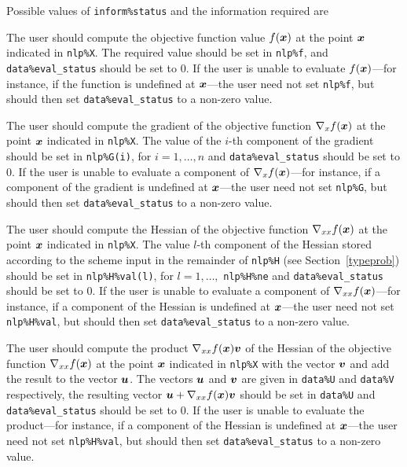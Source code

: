 \documentclass{galahad}
\begin{document}
Possible values of {\tt inform\%status} and the information required are
\begin{description}
 The user should compute the objective function
     value $f({\bm{x}})$ at the point ${\bm{x}}$ indicated in {\tt nlp\%X}.
     The required value should be set in {\tt nlp\%f}, and
     {\tt data\%eval\_status} should be set to 0. If the user is
     unable to evaluate $f({\bm{x}})$---for instance, if the function is
     undefined at ${\bm{x}}$---the user need not set {\tt nlp\%f}, but
     should then set {\tt data\%eval\_status} to a non-zero value.

 The user should compute the gradient
     of the objective function $\nabla_x f({\bm{x}})$ at the point ${\bm{x}}$
     indicated in {\tt nlp\%X}.
     The value of the $i$-th component of the gradient should be set
     in {\tt nlp\%G(i)},      for $i = 1, \ldots, n$ and
     {\tt data\%eval\_status} should be set to 0. If the user is
     unable to evaluate a component of $\nabla_x f({\bm{x}})$---for instance,
     if a component of the gradient is
     undefined at ${\bm{x}}$---the user need not set {\tt nlp\%G}, but
     should then set {\tt data\%eval\_status} to a non-zero value.

 The user should compute the Hessian
     of the objective function $\nabla_{xx} f({\bm{x}})$ at the point ${\bm{x}}$
     indicated in {\tt nlp\%X}.
     The value $l$-th component of the Hessian stored according to the
     scheme input in the remainder of {\tt nlp\%H} (see Section~\ref{typeprob})
     should be set in {\tt nlp\%H\%val(l)},
     for $l = 1, \ldots,$ {\tt  nlp\%H\%ne} and
     {\tt data\%eval\_status} should be set to 0. If the user is
     unable to evaluate a component of $\nabla_{xx} f({\bm{x}})$---for instance,
     if a component of the Hessian is
     undefined at ${\bm{x}}$---the user need not set {\tt nlp\%H\%val}, but
     should then set {\tt data\%eval\_status} to a non-zero value.

 The user should compute the product
     $\nabla_{xx} f({\bm{x}}){\bm{v}}$ of the Hessian
     of the objective function $\nabla_{xx} f({\bm{x}})$ at the point ${\bm{x}}$
     indicated in {\tt nlp\%X} with the vector ${\bm{v}}$ and add the result to
     the vector ${\bm{u}}$. The vectors ${\bm{u}}$ and ${\bm{v}}$ are given in
     {\tt data\%U} and {\tt data\%V} respectively, the resulting
     vector ${\bm{u}} + \nabla_{xx} f({\bm{x}}){\bm{v}}$ should be set in {\tt data\%U}
     and  {\tt data\%eval\_status} should be set to 0. If the user is
     unable to evaluate the product---for instance,
     if a component of the Hessian is
     undefined at ${\bm{x}}$---the user need not set {\tt nlp\%H\%val}, but
     should then set {\tt data\%eval\_status} to a non-zero value.


\end{description}
\end{document}
